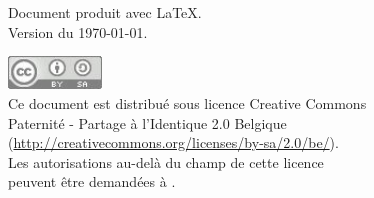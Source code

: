 
\thispagestyle{empty}

\vfill

\bigskip
\noindent
Document produit avec \LaTeX.
\\Version du \today.

\vfill

\noindent
\includegraphics[width=25mm]{image/cc-gris}
\\
Ce document est distribué sous licence Creative Commons 
\\Paternité - Partage à l'Identique 2.0 Belgique 
\\(\url{http://creativecommons.org/licenses/by-sa/2.0/be/}).
\\Les autorisations au-delà du champ de cette licence
\\peuvent être demandées à \texttt{\contact}.
